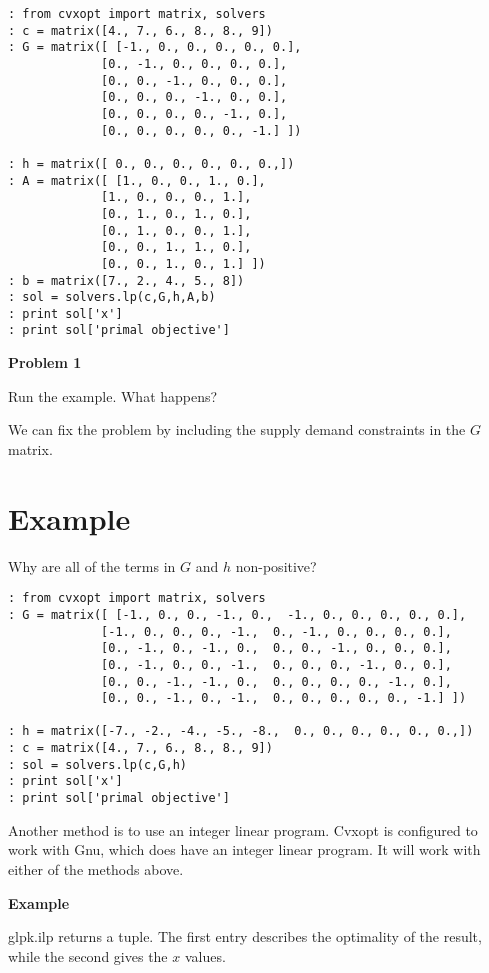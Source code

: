 \begin{lstlisting}
: from cvxopt import matrix, solvers
: c = matrix([4., 7., 6., 8., 8., 9])
: G = matrix([ [-1., 0., 0., 0., 0., 0.],
             [0., -1., 0., 0., 0., 0.],
             [0., 0., -1., 0., 0., 0.],
             [0., 0., 0., -1., 0., 0.],
             [0., 0., 0., 0., -1., 0.],
             [0., 0., 0., 0., 0., -1.] ])
        
: h = matrix([ 0., 0., 0., 0., 0., 0.,])
: A = matrix([ [1., 0., 0., 1., 0.],
             [1., 0., 0., 0., 1.],
             [0., 1., 0., 1., 0.],
             [0., 1., 0., 0., 1.],
             [0., 0., 1., 1., 0.],
             [0., 0., 1., 0., 1.] ])
: b = matrix([7., 2., 4., 5., 8]) 
: sol = solvers.lp(c,G,h,A,b)  
: print sol['x']
: print sol['primal objective']
\end{lstlisting}

\textbf{Problem 1}

Run the example.
What happens?

We can fix the problem by including the supply demand constraints in the $G$ matrix.

\section*{Example}
Why are all of the terms in $G$ and $h$ non-positive?

\begin{lstlisting}
: from cvxopt import matrix, solvers
: G = matrix([ [-1., 0., 0., -1., 0.,  -1., 0., 0., 0., 0., 0.],
             [-1., 0., 0., 0., -1.,  0., -1., 0., 0., 0., 0.],
             [0., -1., 0., -1., 0.,  0., 0., -1., 0., 0., 0.],
             [0., -1., 0., 0., -1.,  0., 0., 0., -1., 0., 0.],
             [0., 0., -1., -1., 0.,  0., 0., 0., 0., -1., 0.],
             [0., 0., -1., 0., -1.,  0., 0., 0., 0., 0., -1.] ])

: h = matrix([-7., -2., -4., -5., -8.,  0., 0., 0., 0., 0., 0.,])
: c = matrix([4., 7., 6., 8., 8., 9])
: sol = solvers.lp(c,G,h)
: print sol['x']
: print sol['primal objective']
\end{lstlisting}

Another method is to use an integer linear program.
Cvxopt is configured to work with  Gnu, which does have an integer linear program.
It will work with either of the methods above. 

\textbf{Example}

glpk.ilp returns a tuple.
The first entry describes the optimality of the result, while the second gives the $x$ values.

